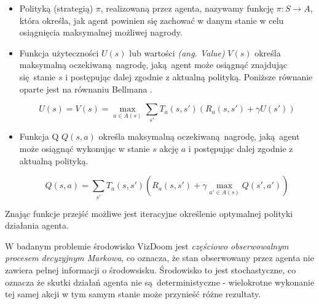 \begin{itemize}
\item Polityką (strategią) $\pi$, realizowaną przez agenta, nazywamy funkcję $ \pi: S \rightarrow A$, która określa, jak agent powinien się zachować w danym stanie w celu osiągnięcia maksymalnej możliwej nagrody.
\item Funkcja użyteczności $U(s)$ lub wartości \textit{(ang. Value)} $V(s)$ określa maksymalną oczekiwaną nagrodę, jaką agent może osiągnąć znajdując się stanie $s$ i postępując dalej zgodnie z aktualną polityką. Poniższe równanie oparte jest na równaniu Bellmana \cite{bellman1954}.

$$U(s) = V(s) = \max_{a \in A(s)} \sum_{s'} T_a(s,s')(R_a(s,s') + \gamma U(s'))$$
\item Funkcja Q $Q(s,a)$ określa maksymalną oczekiwaną nagrodę, jaką agent może osiągnąć wykonując w stanie $s$ akcję $a$ i postępując dalej zgodnie z aktualną polityką.

$$Q(s,a) = \sum_{s'} T_a(s,s')(R_a(s,s') + \gamma \max_{a' \in A(s)}Q(s',a'))$$

\end{itemize}

\vspace{5mm}

Znając funkcje przejść możliwe jest iteracyjne określenie optymalnej polityki działania agenta. 

W badanym problemie środowisko VizDoom jest \textit{częściowo obserwowalnym procesem decyzyjnym Markowa}, co oznacza, że stan obserwowany przez agenta nie zawiera pełnej informacji o środowsisku. Środowisko to jest stochastyczne, co oznacza że skutki działań agenta nie są deterministyczne - wielokrotne wykonanie tej samej akcji w tym samym stanie może przynieść różne rezultaty.
